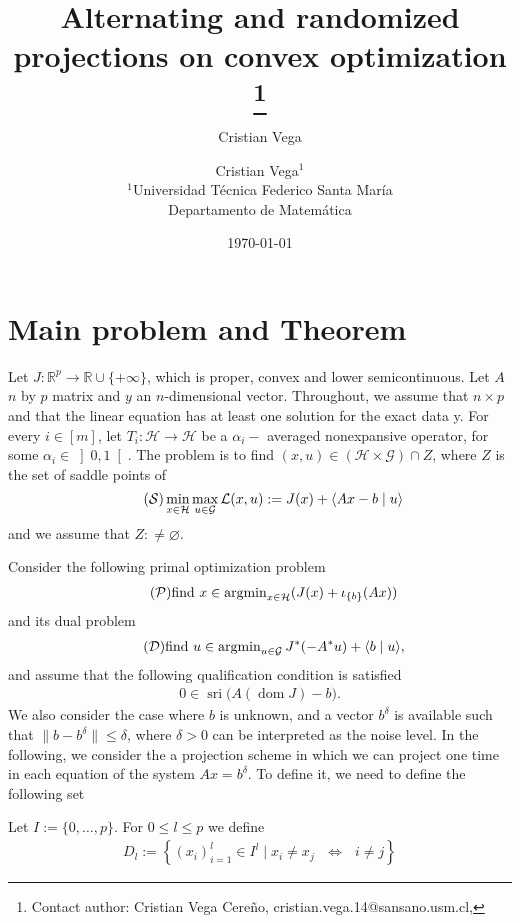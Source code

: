 \documentclass[11pt]{report}
\author{Cristian Vega}
\title{\sffamily Alternating and randomized projections on convex optimization
\footnote{Contact author: 
Cristian Vega Cere\~no, {\ttfamily cristian.vega.14@sansano.usm.cl},
}}
\author{Cristian Vega$^1$ 
\\[5mm]
\small $\!^1$Universidad T\'ecnica Federico Santa Mar\'ia\\
\small Departamento de Matem\'atica\\
}
\date{\ttfamily \today}
\newcommand{\scal}[2]{{\left\langle{{#1}\mid{#2}}\right\rangle}}
\newcommand{\HH}{\ensuremath{{\mathcal H}}}
\newcommand{\GG}{\ensuremath{{\mathcal G}}}
\newcommand{\emp}{\ensuremath{{\varnothing}}}
\newcommand{\argmin}{\ensuremath{\operatorname{argmin}}}
\newcommand{\dom}{\ensuremath{\operatorname{dom}}}
\newcommand{\sri}{\ensuremath{\operatorname{sri}}}
\theoremstyle{plain}{\theorembodyfont{\rmfamily}%
\newtheorem{assumption}[theorem]{Assumption}}
\theoremstyle{plain}{\theorembodyfont{\rmfamily}%
\newtheorem{algorithm}[theorem]{Algorithm}}
\theoremstyle{plain}{\theorembodyfont{\rmfamily}%
\newtheorem{example}[theorem]{Example}}
\theoremstyle{plain}{\theorembodyfont{\rmfamily}%
\newtheorem{remark}[theorem]{Remark}}
\theoremstyle{plain}{\theorembodyfont{\rmfamily}%
\newtheorem{definition}[theorem]{Definition}}
\theoremstyle{plain}{\theorembodyfont{\rmfamily}%
\newtheorem{problem}[theorem]{Problem}}
\numberwithin{equation}{chapter}
\newcommand{\dal}{u}
\newcommand{\prim}{x}
\begin{document}
\chapter{Main problem and Theorem} 
 \begin{problem}
\label{problema 1}
 Let $J\colon\mathbb{R}^{p}\rightarrow\mathbb{R}\cup\{+\infty\}$, 
which is proper, convex and lower semicontinuous. Let $A$ $n$ by $p$ matrix and $y$ an $n$-dimensional vector. Throughout, we
assume that $n\times p$ and that the linear equation has at least one solution for the exact
data y. For 
every $i\in[m]$, let $T_i\colon\HH\to\HH$ be a $\alpha_{i}-$ 
averaged nonexpansive operator, for some $\alpha_i\in\left]0,1\right[$. The 
problem is to find $(\prim,\dal)\in (\HH\times\GG)\cap Z$, where 
$Z$ is the 
set of saddle points of
\begin{equation}
\label{e:saddle point}\tag{$\mathcal{S}$}
\min_{\prim\in\HH}\max_{\dal\in\GG}\mathcal{L}(\prim,\dal):=J(\prim)+\scal{A\prim-b}{\dal}
\end{equation}
and we assume that  
$Z:\ne\emp$.
\end{problem} 
Consider the following primal optimization problem 
\begin{align}
\tag{$\mathcal{P}$}
\mbox{find}\,\, \prim\in\argmin_{\prim\in\HH} 
(J(\prim)+\iota_{\{b\}}(A\prim))
\label{equation 1.1}
\end{align}
and its dual problem
\begin{align}
\tag{$\mathcal{D}$}
\mbox{find}\,\, \dal\in\argmin_{\dal\in\GG} 
J^{*}(-A^{*}\dal)+\scal{b}{\dal}, 
\label{equation 1.2}
\end{align}
and assume that the following qualification condition is satisfied
\begin{align}
\label{equation 1.10}
0\in \sri\big(A\left(\dom J\right)-b\big).
\end{align}
We also consider the case where $b$ is unknown, and a vector $b^\delta$ is available such that $\|b-b^{\delta}\|\leq\delta$, where $\delta>0$ can be interpreted as the noise level. In the following, we consider the a projection scheme in which we can project one time in each equation of the system $A\prim=b^{\delta}.$ To define it, we need to define the following set
\begin{definition}
Let $I:=\{0,\ldots,p\}$. For $0\leq l\leq p$ we define 
\begin{align}
    D_{l}:=\left\{(\prim_i)_{i=1}^{l}\in I^l\mid \prim_i\neq \prim_j \text{ $\iff$ }i\neq j\right\} 
\end{align}
\end{definition}
\end{document}
